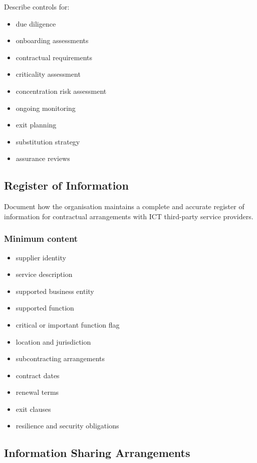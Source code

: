 \documentclass[
  letterpaper,
  DIV=11,
  numbers=noendperiod]{scrartcl}
\providecommand{\tightlist}{%
  \setlength{\itemsep}{0pt}\setlength{\parskip}{0pt}}
\begin{document}
Describe controls for:

\begin{itemize}
\tightlist
\item
  due diligence
\item
  onboarding assessments
\item
  contractual requirements
\item
  criticality assessment
\item
  concentration risk assessment
\item
  ongoing monitoring
\item
  exit planning
\item
  substitution strategy
\item
  assurance reviews
\end{itemize}

\subsection{Register of Information}\label{register-of-information}

Document how the organisation maintains a complete and accurate register
of information for contractual arrangements with ICT third-party service
providers.

\subsubsection{Minimum content}\label{minimum-content}

\begin{itemize}
\tightlist
\item
  supplier identity
\item
  service description
\item
  supported business entity
\item
  supported function
\item
  critical or important function flag
\item
  location and jurisdiction
\item
  subcontracting arrangements
\item
  contract dates
\item
  renewal terms
\item
  exit clauses
\item
  resilience and security obligations
\end{itemize}

\subsection{Information Sharing
Arrangements}\label{information-sharing-arrangements}
\end{document}
